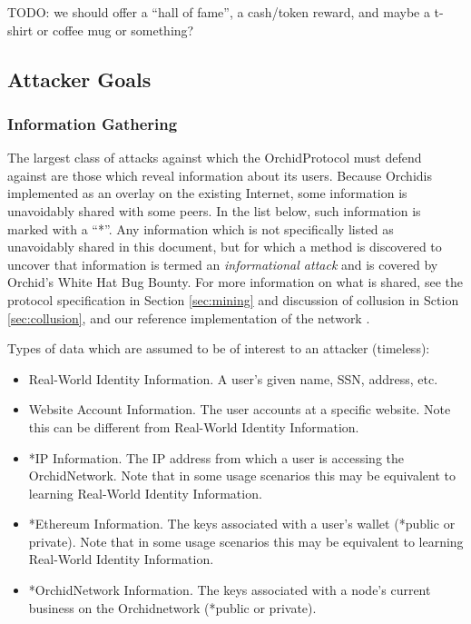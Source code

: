 \documentclass{article}
\newcommand{\orchid}{Orchid}
\newcommand{\Orchid}{\orchid}
\begin{document}
TODO: we should offer a “hall of fame”, a cash/token reward, and maybe a t-shirt or coffee mug or something?


\subsection{Attacker Goals}

\subsubsection{Information Gathering}

The largest class of attacks against which the \Orchid Protocol must defend against are those which reveal information about its users. Because \Orchid is implemented as an overlay on the existing Internet, some information is unavoidably shared with some peers. In the list below, such information is marked with a “*”. Any information which is not specifically listed as unavoidably shared in this document, but for which a method is discovered to uncover that information is termed an \emph{informational attack} and is covered by \Orchid’s White Hat Bug Bounty. For more information on what is shared, see the protocol specification in Section \ref{sec:mining} and discussion of collusion in Sction \ref{sec:collusion}, and our reference implementation of the network \cite{oursoftware}.

Types of data which are assumed to be of interest to an attacker (timeless):

\begin{itemize}
\item Real-World Identity Information. A user’s given name, SSN, address, etc.
\item Website Account Information. The user accounts at a specific website. Note this can be different from Real-World Identity Information.
\item *IP Information. The IP address from which a user is accessing the \Orchid Network. Note that in some usage scenarios this may be equivalent to learning Real-World Identity Information.
\item *Ethereum Information. The keys associated with a user’s wallet (*public or private). Note that in some usage scenarios this may be equivalent to learning Real-World Identity Information.
\item *\Orchid Network Information. The keys associated with a node’s current business on the \Orchid network (*public or private).
\end{itemize}
\end{document}
